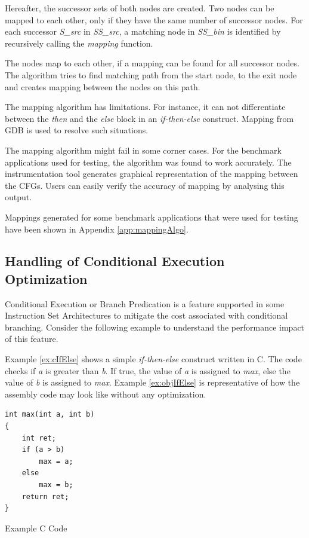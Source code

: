 Hereafter, the successor sets of both nodes are created. Two nodes can be mapped to each other, only if they have the same number of successor nodes. For each successor \emph{S\_src} in \emph{SS\_src}, a matching node in \emph{SS\_bin} is identified by recursively calling the \emph{mapping} function. 

The nodes map to each other, if a mapping can be found for all successor nodes. The algorithm tries to find matching path from the start node, to the exit node and creates mapping between the nodes on this path.

The mapping algorithm has limitations. For instance, it can not differentiate between the \emph{then} and the \emph{else} block in an \emph{if-then-else} construct. Mapping from GDB is used to resolve such situations.

The mapping algorithm might fail in some corner cases. For the benchmark applications used for testing, the algorithm was found to work accurately.
The instrumentation tool generates graphical representation of the mapping between the CFGs. Users can easily verify the accuracy of mapping by analysing this output.

Mappings generated for some benchmark applications that were used for testing have been shown in Appendix \ref{app:mappingAlgo}.

\subsection{Handling of Conditional Execution Optimization}
\label{subsec:CondExec}


Conditional Execution or Branch Predication is a feature supported in some Instruction Set Architectures to mitigate the cost associated with conditional branching. Consider the following example to understand the performance impact of this feature.

Example \ref{ex:cIfElse} shows a simple \emph{if-then-else} construct written in C. The code checks if \emph{a} is greater than \emph{b}. If true, the value of \emph{a} is assigned to \emph{max}, else the value of \emph{b} is assigned to \emph{max}. Example \ref{ex:objIfElse} is representative of how the assembly code may look like without any optimization.

\begin{Example}[h]
\begin{lstlisting}
int max(int a, int b)
{
    int ret;
    if (a > b)
        max = a;
    else
        max = b;
    return ret;
}
\end{lstlisting}
\caption{Example C Code}
\label{ex:cIfElse}
\end{Example}

